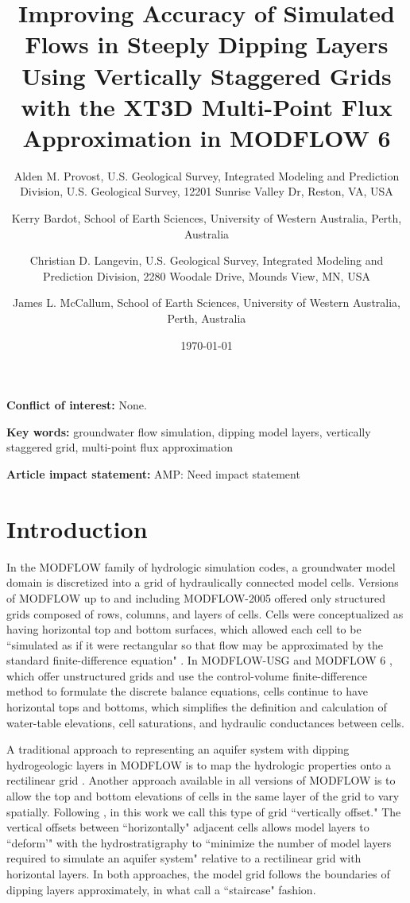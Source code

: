 \documentclass{article}
\title{Improving Accuracy of Simulated Flows in Steeply Dipping Layers Using Vertically Staggered Grids with the XT3D Multi-Point Flux Approximation in MODFLOW 6}
\author{
	Alden M. Provost, U.S. Geological Survey, Integrated Modeling and Prediction Division, U.S. Geological Survey, 12201 Sunrise Valley Dr, Reston, VA, USA  \\
	\and 
	Kerry Bardot, School of Earth Sciences, University of Western Australia, Perth, Australia \\
	\and 
	Christian D. Langevin, U.S. Geological Survey, Integrated Modeling and Prediction Division, 2280 Woodale Drive, Mounds View, MN, USA \\
	\and 
	James L. McCallum, School of Earth Sciences, University of Western Australia, Perth, Australia \\
	}
\date{\today}
\begin{document}
\maketitle

\textbf{Conflict of interest:} None.

\textbf{Key words:} groundwater flow simulation, dipping model layers, vertically staggered grid, multi-point flux approximation

\textbf{Article impact statement:} {\color{red} AMP: Need impact statement}

\begin{abstract}
\end{abstract}

\section{Introduction}

In the MODFLOW family of hydrologic simulation codes, a groundwater model domain is discretized into a grid of hydraulically connected model cells. Versions of MODFLOW up to and including MODFLOW-2005 \citep{modflow2005} offered only structured grids composed of rows, columns, and layers of cells. Cells were conceptualized as having horizontal top and bottom surfaces, which allowed each cell to be ``simulated as if it were rectangular so that flow may be approximated by the standard finite-difference equation" \citep{modflow84}. In MODFLOW-USG \citep{modflowusg} and MODFLOW 6 \citep{modflow6gwf}, which offer unstructured grids and use the control-volume finite-difference method to formulate the discrete balance equations, cells continue to have horizontal tops and bottoms, which simplifies the definition and calculation of water-table elevations, cell saturations, and hydraulic conductances between cells.

A traditional approach to representing an aquifer system with dipping hydrogeologic layers in MODFLOW is to map the hydrologic properties onto a rectilinear grid \citep{modflow84}. Another approach available in all versions of MODFLOW is to allow the top and bottom elevations of cells in the same layer of the grid to vary spatially. Following \cite{bardot2022}, in this work we call this type of grid ``vertically offset." The vertical offsets between ``horizontally" adjacent cells allows model layers to ``deform'" with the hydrostratigraphy to ``minimize the number of model layers required to simulate an aquifer system" \citep{modflow84} relative to a rectilinear grid with horizontal layers. In both approaches, the model grid follows the boundaries of dipping layers approximately, in what \cite{bardot2022} call a ``staircase" fashion.
\end{document}
